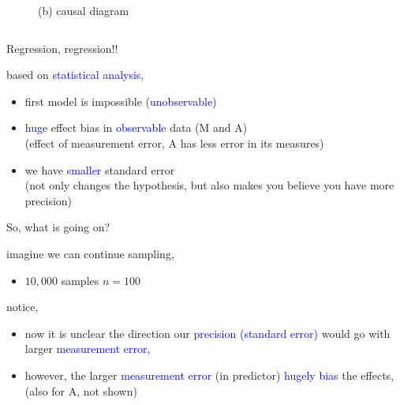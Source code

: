 \begin{frame}
\begin{columns}
\begin{column}{0.5\textwidth}
\begin{figure}
				\caption*{(b) causal diagram}
			\end{figure}
		\end{column}
	\end{columns}
\end{frame}
%
%
\begin{lhframe}[rhgraphic={\texttt{[image: descendant6\_reg.png]}}]
	{Regression, regression!!}
	
	based on \textcolor{blue}{statistical analysis},
	\begin{itemize}
		\item first model is impossible (\textcolor{blue}{unobservable})
		\item \textcolor{blue}{huge} effect bias in \textcolor{blue}{observable} data (M  and A) \\
		{\small (effect of measurement error, A has less error in its measures)}
		\item we have \textcolor{blue}{smaller} standard error \\
		{\small (not only changes the hypothesis, but also makes you believe you have more precision)}
	\end{itemize}
\end{lhframe}
%
%
\begin{lhframe}[rhgraphic={\texttt{[image: descendant6\_samplesize.pdf]}}]
	{So, what is going on?}
	
	imagine we can continue sampling,
	\begin{itemize}
		\item $10,000$ samples $n=100$
	\end{itemize}
	
	notice,
	\begin{itemize}
		\item now it is unclear the direction our \textcolor{blue}{precision (standard error)} would go with larger \textcolor{blue}{measurement error},
		\item however, the larger \textcolor{blue}{measurement error} (in predictor) \textcolor{blue}{hugely bias} the effects, \\
		{\small (also for A, not shown)}
	\end{itemize}
\end{lhframe}
